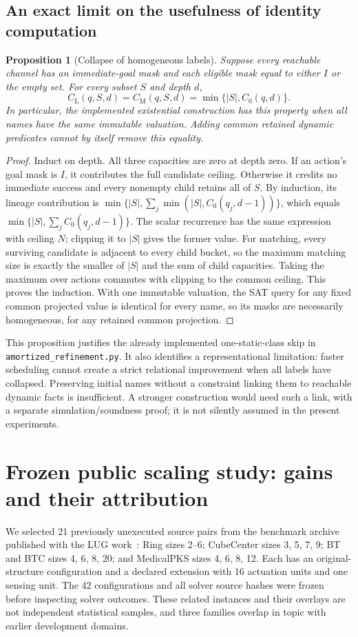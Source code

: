 \documentclass[11pt]{article}
\newtheorem{proposition}[theorem]{Proposition}
\theoremstyle{definition}
\newcommand{\card}[1]{\lvert #1\rvert}
\newcommand{\CL}{C_{\mathrm L}}
\newcommand{\CM}{C_{\mathrm M}}
\begin{document}
\subsection{An exact limit on the usefulness of identity computation}
\begin{proposition}[Collapse of homogeneous labels]\label{prop:collapse}
Suppose every reachable channel has an immediate-goal mask and each eligible
mask equal to either $I$ or the empty set. For every subset $S$ and depth $d$,
\[
 \CL(q,S,d)=\CM(q,S,d)=\min\{\card S,C_0(q,d)\}.
\]
In particular, the implemented existential construction has this property when
all names have the same immutable valuation. Adding common retained dynamic
predicates cannot by itself remove this equality.
\end{proposition}
\begin{proof}
Induct on depth. All three capacities are zero at depth zero. If an action's
goal mask is $I$, it contributes the full candidate ceiling. Otherwise it
credits no immediate success and every nonempty child retains all of $S$.
By induction, its lineage contribution is
$\min\{\card S,\sum_j\min(\card S,C_0(q_j,d-1))\}$, which equals
$\min\{\card S,\sum_j C_0(q_j,d-1)\}$. The scalar recurrence has the same
expression with ceiling $N$; clipping it to $\card S$ gives the former value.
For matching, every surviving candidate is adjacent to every child bucket,
so the maximum matching size is exactly the smaller of $\card S$ and the sum
of child capacities. Taking the maximum over actions commutes with clipping
to the common ceiling. This proves the induction. With one immutable valuation,
the SAT query for any fixed common projected value is identical for every name,
so its masks are necessarily homogeneous, for any retained common projection.
\end{proof}

This proposition justifies the already implemented one-static-class skip in
\texttt{amortized\_refinement.py}. It also identifies a representational
limitation: faster scheduling cannot create a strict relational improvement
when all labels have collapsed. Preserving initial names without a constraint
linking them to reachable dynamic facts is insufficient. A stronger construction
would need such a link, with a separate simulation/soundness proof; it is not
silently assumed in the present experiments.

\section{Frozen public scaling study: gains and their attribution}
We selected 21 previously unexecuted source pairs from the benchmark archive
published with the LUG work~\cite{lugdomains}: Ring sizes 2--6; CubeCenter
sizes 3, 5, 7, 9; BT and BTC sizes 4, 6, 8, 20; and MedicalPKS sizes 4, 6, 8, 12.
Each has an original-structure configuration and a declared extension with
16 actuation units and one sensing unit. The 42 configurations and all solver
source hashes were frozen before inspecting solver outcomes. These related
instances and their overlays are not independent statistical samples, and
three families overlap in topic with earlier development domains.
\end{document}
